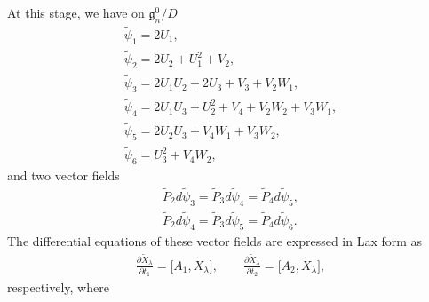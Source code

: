 \documentclass[10pt,a4paper]{amsart}
\numberwithin{equation}{section}
\begin{document}
At this stage, we have on $\mathfrak{g}^0_n/D$
\begin{gather*}
\widetilde{\psi}_1 = 2U_1, \\
\widetilde{\psi}_2 = 2U_2+U_1^2+V_2, \\
\widetilde{\psi}_3 = 2U_1U_2 + 2U_3 + V_3 + V_2W_1, \\
\widetilde{\psi}_4 = 2U_1U_3 + U_2^2 + V_4 + V_2W_2+ V_3W_1, \\
\widetilde{\psi}_5 = 2U_2U_3 + V_4W_1 + V_3W_2, \\
\widetilde{\psi}_6 = U_3^2 + V_4W_2,
\end{gather*}
and two vector f\/ields
\begin{gather}
 \widetilde{P}_2d\widetilde{\psi}_3 = \widetilde{P}_3d\widetilde{\psi}_4 = \widetilde{P}_4d\widetilde{\psi}_5,\label{vec1} \\
 \widetilde{P}_2d\widetilde{\psi}_4 = \widetilde{P}_3d\widetilde{\psi}_5 = \widetilde{P}_4d\widetilde{\psi}_6.\label{vec2}
\end{gather}
The dif\/ferential equations of these vector f\/ields are expressed in Lax form as
\begin{gather}
\frac{\partial \widetilde{X}_\lambda }{\partial t_1} = \big[A_1, \widetilde{X}_\lambda \big], \qquad
\frac{\partial \widetilde{X}_\lambda }{\partial t_2} = \big[A_2, \widetilde{X}_\lambda \big],\label{Lax4}
\end{gather}
respectively, where
\end{document}
